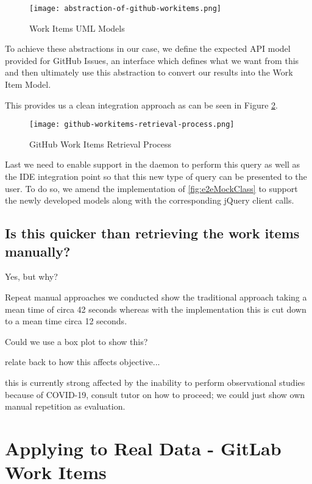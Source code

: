 \begin{figure}[h!]
	\centering
	\texttt{[image: abstraction-of-github-workitems.png]}
	\caption{Work Items UML Models}
	\label{fig:abstractionOfGitHubWorkItems}
\end{figure}

To achieve these abstractions in our case, we define the expected API model provided for GitHub Issues, an interface which defines what we want from this and then ultimately use this abstraction to convert our results into the Work Item Model.

This provides us a clean integration approach as can be seen in Figure \ref{fig:gitHubworkItemsRetrievalProcess}.

\begin{figure}[h!]
	\centering
	\texttt{[image: github-workitems-retrieval-process.png]}
	\caption{GitHub Work Items Retrieval Process}
	\label{fig:gitHubworkItemsRetrievalProcess}
\end{figure}

Last we need to enable support in the daemon to perform this query as well as the IDE integration point so that this new type of query can be presented to the user. To do so, we amend the implementation of \ref{fig:e2eMockClass} to support the newly developed models along with the corresponding jQuery client calls.

\subsection{Is this quicker than retrieving the work items manually?}

Yes, but why?

Repeat manual approaches we conducted show the traditional approach taking a mean time of circa 42 seconds whereas with the implementation this is cut down to a mean time circa 12 seconds. 

Could we use a box plot to show this?

relate back to how this affects objective... 

this is currently strong affected by the inability to perform observational studies because of COVID-19, consult tutor on how to proceed; we could just show own manual repetition as evaluation.

\section{Applying to Real Data - GitLab Work Items}


